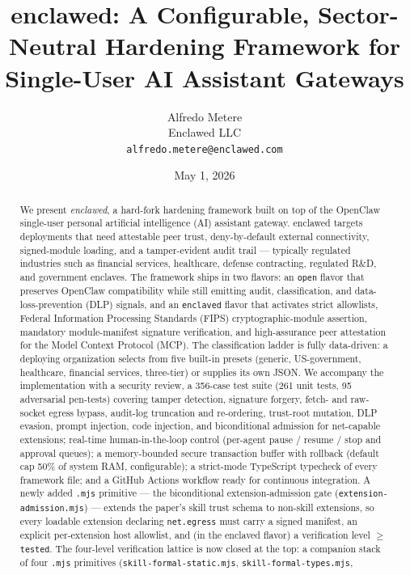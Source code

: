 \documentclass[11pt]{article}
\title{
  \textbf{enclawed}: A Configurable, Sector-Neutral Hardening Framework for
  Single-User AI Assistant Gateways
}
\author{%
  Alfredo Metere\\
  Enclawed LLC\\
  \texttt{alfredo.metere@enclawed.com}
}
\date{May 1, 2026}
\begin{document}
\maketitle

\begin{abstract}
We present \emph{enclawed}, a hard-fork hardening framework built on top of
the OpenClaw single-user personal artificial intelligence (AI) assistant
gateway. enclawed targets deployments that need attestable peer trust,
deny-by-default external connectivity, signed-module loading, and a
tamper-evident audit trail --- typically regulated industries such as
financial services, healthcare, defense contracting, regulated R\&D, and
government enclaves. The framework ships in two flavors: an \texttt{open}
flavor that preserves OpenClaw compatibility while still emitting audit,
classification, and data-loss-prevention (DLP) signals, and an
\texttt{enclaved} flavor that activates strict allowlists, Federal
Information Processing Standards (FIPS) cryptographic-module assertion,
mandatory module-manifest signature verification, and high-assurance
peer attestation for the Model Context Protocol (MCP). The classification ladder is fully data-driven: a deploying
organization selects from five built-in presets (generic, US-government,
healthcare, financial services, three-tier) or supplies its own JSON. We
accompany the implementation with a security review, a 356-case test
suite (261 unit tests, 95 adversarial pen-tests) covering tamper
detection, signature forgery, fetch- and raw-socket egress bypass,
audit-log truncation and re-ordering, trust-root mutation, DLP evasion,
prompt injection, code injection, and biconditional admission for
net-capable extensions; real-time human-in-the-loop control (per-agent
pause / resume / stop and approval queues); a memory-bounded secure
transaction buffer with rollback (default cap 50\% of system RAM,
configurable); a strict-mode TypeScript typecheck of every framework
file; and a GitHub Actions workflow ready for continuous integration.
A newly added \texttt{.mjs} primitive --- the biconditional
extension-admission gate (\texttt{extension-admission.mjs}) ---
extends the paper's skill trust schema to non-skill extensions, so
every loadable extension declaring \texttt{net.egress} must carry a
signed manifest, an explicit per-extension host allowlist, and (in the
enclaved flavor) a verification level $\geq$ \texttt{tested}.
The four-level verification lattice is now closed at the top: a
companion stack of four \texttt{.mjs} primitives
(\texttt{skill-formal-static.mjs}, \texttt{skill-formal-types.mjs},

\end{abstract}
\end{document}
